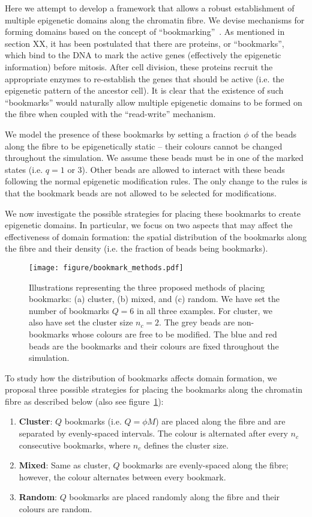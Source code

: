\documentclass[12pt]{article}
\begin{document}
Here we attempt to develop a framework that allows a robust establishment of multiple epigenetic domains along the chromatin fibre. We devise mechanisms for forming domains based on the concept of ``bookmarking''~\cite{sarge2005}. As mentioned in section XX, it has been postulated that there are proteins, or ``bookmarks'', which bind to the DNA to mark the active genes (effectively the epigenetic information) before mitosis. After cell division, these proteins recruit the appropriate enzymes to re-establish the genes that should be active (i.e. the epigenetic pattern of the ancestor cell). It is clear that the existence of such ``bookmarks'' would naturally allow multiple epigenetic domains to be formed on the fibre when coupled with the ``read-write'' mechanism.

We model the presence of these bookmarks by setting a fraction $\phi$ of the beads along the fibre to be epigenetically static -- their colours cannot be changed throughout the simulation. We assume these beads must be in one of the marked states (i.e. $q = 1$ or $3$). Other beads are allowed to interact with these beads following the normal epigenetic modification rules. The only change to the rules is that the bookmark beads are not allowed to be selected for modifications. 

We now investigate the possible strategies for placing these bookmarks to create epigenetic domains. In particular, we focus on two aspects that may affect the effectiveness of domain formation: the spatial distribution of the bookmarks along the fibre and their density (i.e. the fraction of beads being bookmarks). 

\begin{figure}[t]
\centering
\texttt{[image: figure/bookmark\_methods.pdf]}
\caption{Illustrations representing the three proposed methods of placing bookmarks: (a) cluster, (b) mixed, and (c) random.  We have set the number of bookmarks $Q = 6$ in all three examples. For cluster, we also have set the cluster size $n_c = 2$. The grey beads are non-bookmarks whose colours are free to be modified. The blue and red beads are the bookmarks and their colours are fixed throughout the simulation.}
\label{fig:bookmark_methods}
\end{figure}

To study how the distribution of bookmarks affects domain formation, we proposal three possible strategies for placing the bookmarks along the chromatin fibre as described below (also see figure~\ref{fig:bookmark_methods}):
\begin{enumerate}
\item \textbf{Cluster}: $Q$ bookmarks (i.e. $Q = \phi M$) are placed along the fibre and are separated by evenly-spaced intervals. The colour is alternated after every $n_c$ consecutive bookmarks, where $n_c$ defines the cluster size. 
\item \textbf{Mixed}: Same as cluster, $Q$ bookmarks are evenly-spaced along the fibre; however, the colour alternates between every bookmark. 
\item \textbf{Random}: $Q$ bookmarks are placed randomly along the fibre and their colours are random.
\end{enumerate}
\end{document}
